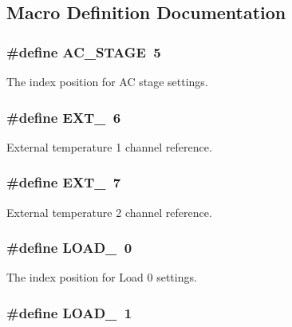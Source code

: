 \subsection{Macro Definition Documentation}
\hypertarget{a00027_a3fc4318ae73eae35339f616047300b0f}{
\subsubsection[{A\-C\-\_\-\-S\-T\-A\-G\-E}]{\setlength{\rightskip}{0pt plus 5cm}\#define A\-C\-\_\-\-S\-T\-A\-G\-E~5}}\label{a00027_a3fc4318ae73eae35339f616047300b0f}
The index position for A\-C stage settings. \hypertarget{a00027_ae72b26dfe821ff1cfeb352b6b54e5cbb}{
\subsubsection[{E\-X\-T\-\_\-1}]{\setlength{\rightskip}{0pt plus 5cm}\#define E\-X\-T\-\_~6}}\label{a00027_ae72b26dfe821ff1cfeb352b6b54e5cbb}
External temperature 1 channel reference. \hypertarget{a00027_a461d83d7d883765da6f6b257a7a4c385}{
\subsubsection[{E\-X\-T\-\_\-2}]{\setlength{\rightskip}{0pt plus 5cm}\#define E\-X\-T\-\_~7}}\label{a00027_a461d83d7d883765da6f6b257a7a4c385}
External temperature 2 channel reference. \hypertarget{a00027_a007a209cd2e2b935be1f69218652edc1}{
\subsubsection[{L\-O\-A\-D\-\_\-0}]{\setlength{\rightskip}{0pt plus 5cm}\#define L\-O\-A\-D\-\_~0}}\label{a00027_a007a209cd2e2b935be1f69218652edc1}
The index position for Load 0 settings. \hypertarget{a00027_a363f09c63f2ecb9086b47d72a3f3f57d}{
\subsubsection[{L\-O\-A\-D\-\_\-1}]{\setlength{\rightskip}{0pt plus 5cm}\#define L\-O\-A\-D\-\_~1}}\label{a00027_a363f09c63f2ecb9086b47d72a3f3f57d}
